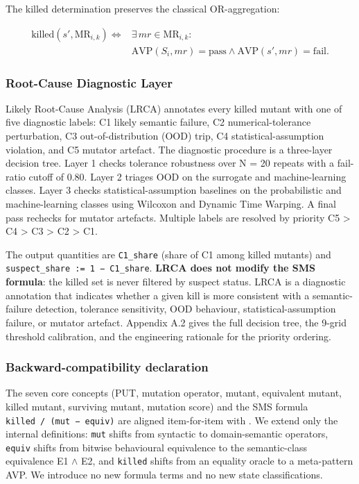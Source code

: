 \documentclass[12pt]{article}
\begin{document}
The killed determination preserves the classical OR-aggregation:

\[
\begin{aligned}
\mathrm{killed}(s', \mathrm{MR}_{i,k}) \iff{} & \exists\,mr \in \mathrm{MR}_{i,k}: \\
& \mathrm{AVP}(S_i, mr) = \text{pass} \wedge
  \mathrm{AVP}(s', mr) = \text{fail}.
\end{aligned}
\]

\subsubsection{Root-Cause Diagnostic Layer}\label{lrca-engineering-attribution-layer-descriptive-not-in-sms}

Likely Root-Cause Analysis (LRCA) annotates every killed mutant with one
of five diagnostic labels: C1 likely semantic failure, C2
numerical-tolerance perturbation, C3 out-of-distribution (OOD) trip, C4
statistical-assumption violation, and C5 mutator artefact. The diagnostic
procedure is a three-layer decision tree.
Layer 1 checks tolerance robustness over N = 20 repeats with a
fail-ratio cutoff of 0.80. Layer 2 triages OOD on the surrogate and
machine-learning classes. Layer 3 checks statistical-assumption
baselines on the probabilistic and machine-learning classes using
Wilcoxon and Dynamic Time Warping. A final pass rechecks for mutator
artefacts. Multiple labels are resolved by priority C5 \textgreater{} C4
\textgreater{} C3 \textgreater{} C2 \textgreater{} C1.

The output quantities are \texttt{C1\_share} (share of C1 among killed
mutants) and \texttt{suspect\_share\ :=\ 1\ −\ C1\_share}. \textbf{LRCA
does not modify the SMS formula}: the killed set is never filtered by
suspect status. LRCA is a diagnostic annotation that indicates
whether a given kill is more consistent with a semantic-failure
detection, tolerance sensitivity, OOD behaviour, statistical-assumption
failure, or mutator artefact. Appendix A.2 gives the full decision tree, the 9-grid
threshold calibration, and the engineering rationale for the priority
ordering.

\subsubsection{Backward-compatibility declaration}\label{backward-compatibility-declaration}

The seven core concepts (PUT, mutation operator, mutant, equivalent
mutant, killed mutant, surviving mutant, mutation score) and the SMS
formula
\texttt{\textbar{}killed\textbar{}\ /\ (\textbar{}mut\textbar{}\ −\ \textbar{}equiv\textbar{})}
are aligned item-for-item with \citet{d7c38286734419b52de4262c9802ebdfcf4b9447}. We extend only the
internal definitions: \texttt{mut} shifts from syntactic to
domain-semantic operators, \texttt{equiv} shifts from bitwise
behavioural equivalence to the semantic-class equivalence E1 $\wedge$ E2, and
\texttt{killed} shifts from an equality oracle to a meta-pattern AVP. We
introduce no new formula terms and no new state classifications.
\end{document}
